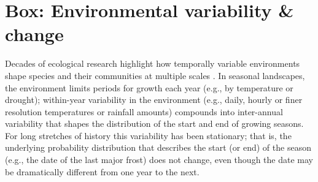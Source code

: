 \documentclass[11pt,letterpaper]{article}
\begin{document}




\newpage


\section{Box: Environmental variability \& change} %
Decades of ecological research highlight how temporally variable environments shape species and their communities at multiple scales \citep{Sale:1977oq,Chesson:1997dz}.  In seasonal landscapes, the environment limits periods for growth each year (e.g., by temperature or drought); within-year variability in the environment (e.g., daily, hourly or finer resolution temperatures or rainfall amounts) compounds into inter-annual variability that shapes the distribution of the start and end of growing seasons. For long stretches of history this variability has been stationary; that is, the underlying probability distribution that describes the start (or end) of the season (e.g., the date of the last major frost) does not change, even though the date may be dramatically different from one year to the  next. %
\end{document}
